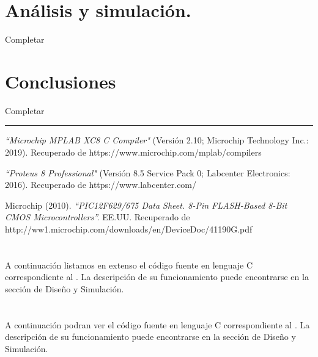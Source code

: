 \documentclass[a4paper]{article}
\let\originalappendix\appendix
\renewcommand{\appendix}{%
    \newpage\originalappendix\pagenumbering{gobble}%
    \renewcommand\thesection{Anexo \Alph{section}}
    \setcounter{secnumdepth}{1}
}
\begin{document}
\section{Análisis y simulación.}

Completar

\section{Conclusiones}

Completar

\noindent\rule{\textwidth}{1pt}

\begin{thebibliography}{9}

\textit{``Microchip MPLAB XC8 C Compiler"}
(Versión 2.10; Microchip Technology Inc.: 2019).
Recuperado de https://www.microchip.com/mplab/compilers

\textit{``Proteus 8 Professional"} 
(Versión 8.5 Service Pack 0; Labcenter Electronics: 2016).
Recuperado de https://www.labcenter.com/

Microchip (2010).
\textit{``PIC12F629/675 Data Sheet. 8-Pin FLASH-Based 8-Bit CMOS 
Microcontrollers''.}
EE.UU. Recuperado de 
http://ww1.microchip.com/downloads/en/DeviceDoc/41190G.pdf

\end{thebibliography}


\appendix

\section{}
A continuación listamos en extenso el código fuente en lenguaje C
correspondiente al . La descripción de su 
funcionamiento puede encontrarse en la sección de Diseño y 
Simulación.

%

\newpage
\section{}
A continuación podran ver el  código fuente en lenguaje C correspondiente
al . La descripción de su funcionamiento puede encontrarse en
la sección de Diseño y Simulación.

%
\end{document}
